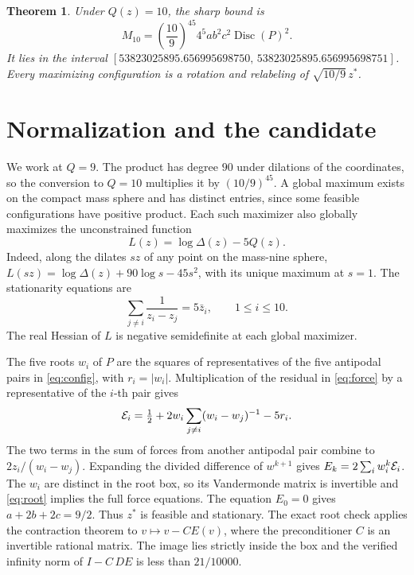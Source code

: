 \documentclass[11pt]{article}
\newtheorem{theorem}{Theorem}
\newcommand{\disc}{\operatorname{Disc}}
\begin{document}
\begin{theorem}\label{thm:main}
Under \(Q(z)=10\), the sharp bound is
\[
 M_{10}=\left(\frac{10}{9}\right)^{45}
         4^5 ab^2c^2\disc(P)^2.
\]
It lies in the interval
\([53823025895.656995698750,\,53823025895.656995698751]\).
Every maximizing configuration is a rotation and relabeling of
\(\sqrt{10/9}\,z^*\).
\end{theorem}

\section{Normalization and the candidate}

We work at \(Q=9\). The product has degree \(90\) under dilations of the
coordinates, so the conversion to \(Q=10\) multiplies it by
\((10/9)^{45}\). A global maximum exists on the compact mass sphere and
has distinct entries, since some feasible configurations have positive
product. Each such maximizer also globally maximizes the unconstrained
function
\[
 L(z)=\log\Delta(z)-5Q(z).
\]
Indeed, along the dilates \(sz\) of any point on the mass-nine sphere,
\(L(sz)=\log\Delta(z)+90\log s-45s^2\), with its unique maximum at \(s=1\).
The stationarity equations are
\begin{equation}
 \sum_{j\ne i}\frac{1}{z_i-z_j}=5\bar z_i,\qquad 1\le i\le10.
                                                               \label{eq:force}
\end{equation}
The real Hessian of \(L\) is negative semidefinite at each global
maximizer.

The five roots \(w_i\) of \(P\) are the squares of representatives of the
five antipodal pairs in \eqref{eq:config}, with \(r_i=|w_i|\).
Multiplication of the residual in \eqref{eq:force} by a representative
of the \(i\)-th pair gives
\[
 {\cal E}_i=\tfrac12+2w_i\sum_{j\ne i}(w_i-w_j)^{-1}-5r_i.
\]
The two terms in the sum of forces from another antipodal pair combine
to \(2z_i/(w_i-w_j)\). Expanding the divided difference of \(w^{k+1}\)
gives \(E_k=2\sum_i w_i^k{\cal E}_i\). The \(w_i\) are distinct in the
root box, so its Vandermonde matrix is invertible and \eqref{eq:root}
implies the full force equations. The equation \(E_0=0\) gives
\(a+2b+2c=9/2\). Thus \(z^*\) is feasible and stationary. The exact
root check \cite{data} applies the contraction theorem to
\(v\mapsto v-C E(v)\), where the preconditioner \(C\) is an invertible
rational matrix. The image lies strictly inside the box and the
verified infinity norm of \(I-C\,DE\) is less than \(21/10000\).
\end{document}
